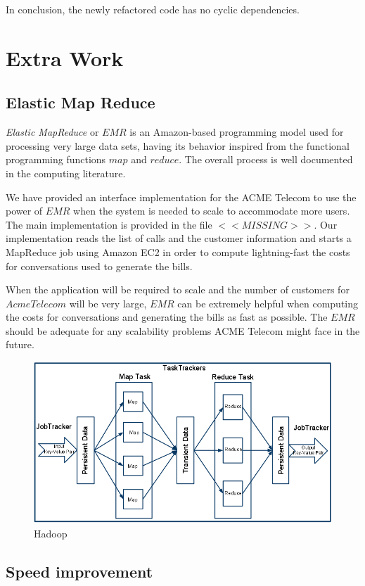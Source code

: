 \documentclass[11pt,twocolumn]{article} %
\begin{document}
In conclusion, the newly refactored code has no cyclic dependencies.

\section{Extra Work}
\subsection{Elastic Map Reduce}
\emph{Elastic MapReduce} or $EMR$ is an Amazon-based programming model used for processing very large data sets, 
having its behavior inspired from the functional programming functions $map$ and $reduce$. The overall process is well
documented in the computing literature.

We have provided an interface implementation for the ACME Telecom to use the power of $EMR$ when the system is needed to scale to 
accommodate more users. The main implementation is provided in the file $<<MISSING>>$. Our implementation reads the list of calls and the 
customer information and starts a MapReduce job using Amazon EC2 in order to compute lightning-fast the costs for conversations used 
to generate the bills.

When the application will be required to scale and the number of customers for $AcmeTelecom$ will be very large, $EMR$ can be extremely 
helpful when computing the costs for conversations and generating the bills as fast as possible. The $EMR$ should be adequate for any 
scalability problems ACME Telecom might face in the future.
\begin{figure}[ht]
\includegraphics[scale=0.25]{hadoop.png}
\caption{Hadoop \cite{hadoop}}
\end{figure}

\subsection{Speed improvement}
\end{document}

